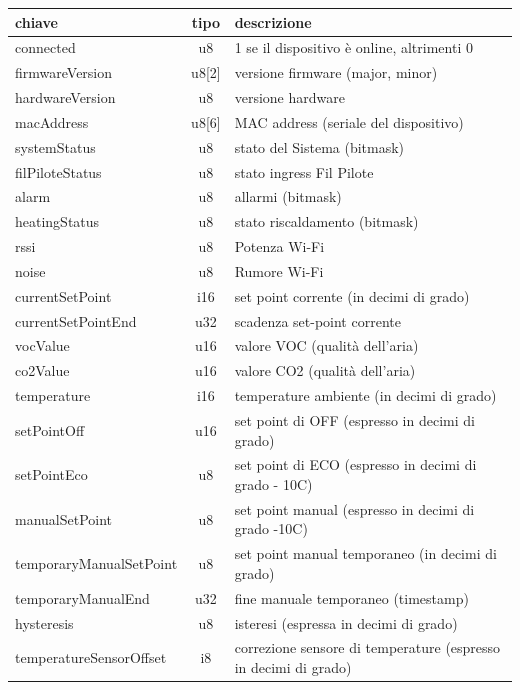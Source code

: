 \documentclass[12pt,a4paper,twoside,titlepage]{book}
\begin{document}
\begin{center}
\begin{longtable}{| p{5cm} | c | p{8cm} |}
    \hline
    \textbf{chiave} & \textbf{tipo} & \textbf{descrizione} \\ \hline
    connected & u8 & 1 se il dispositivo è online, altrimenti 0 \\ \hline
    firmwareVersion & u8[2] & versione firmware (major, minor) \\ \hline
    hardwareVersion & u8 & versione hardware \\ \hline
    macAddress & u8[6] & MAC address (seriale del dispositivo) \\ \hline
    systemStatus & u8 & stato del Sistema (bitmask) \\ \hline
    filPiloteStatus & u8 & stato ingress Fil Pilote \\ \hline
    alarm & u8 & allarmi (bitmask)\\ \hline
    heatingStatus & u8 & stato riscaldamento (bitmask)\\ \hline
    rssi & u8 &Potenza Wi-Fi\\ \hline
    noise & u8 &Rumore Wi-Fi\\ \hline
    currentSetPoint & i16 & set point corrente (in decimi di grado)\\ \hline
    currentSetPointEnd & u32 & scadenza set-point corrente\\ \hline
    vocValue & u16 & valore VOC (qualità dell’aria)\\ \hline
    co2Value & u16 & valore CO2 (qualità dell’aria)\\ \hline
    temperature & i16 & temperature ambiente (in decimi di grado)\\ \hline
    setPointOff & u16 & set point di OFF (espresso in decimi di grado)\\ \hline
    setPointEco & u8 & set point di ECO (espresso in decimi di grado - 10C)\\ \hline
    manualSetPoint & u8 & set point manual (espresso in decimi di grado -10C)\\ \hline
    temporaryManualSetPoint & u8 & set point manual temporaneo (in decimi di grado)\\ \hline
    temporaryManualEnd & u32 & fine manuale temporaneo (timestamp)\\ \hline
    hysteresis & u8 & isteresi (espressa in decimi di grado)\\ \hline
    temperatureSensorOffset & i8 & correzione sensore di temperature (espresso in decimi di grado)\\ \hline

\end{longtable}
\end{center}
\end{document}
